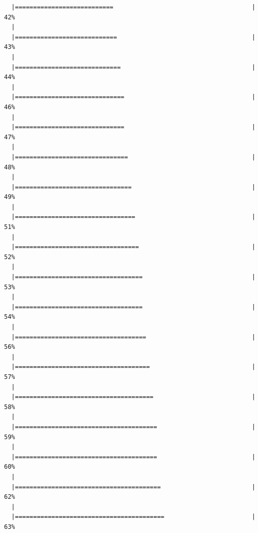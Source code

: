 \documentclass[]{article}
\begin{document}
\begin{verbatim}
  |===========================                                      |  42%
  |                                                                       
  |============================                                     |  43%
  |                                                                       
  |=============================                                    |  44%
  |                                                                       
  |==============================                                   |  46%
  |                                                                       
  |==============================                                   |  47%
  |                                                                       
  |===============================                                  |  48%
  |                                                                       
  |================================                                 |  49%
  |                                                                       
  |=================================                                |  51%
  |                                                                       
  |==================================                               |  52%
  |                                                                       
  |===================================                              |  53%
  |                                                                       
  |===================================                              |  54%
  |                                                                       
  |====================================                             |  56%
  |                                                                       
  |=====================================                            |  57%
  |                                                                       
  |======================================                           |  58%
  |                                                                       
  |=======================================                          |  59%
  |                                                                       
  |=======================================                          |  60%
  |                                                                       
  |========================================                         |  62%
  |                                                                       
  |=========================================                        |  63%

\end{verbatim}
\end{document}
